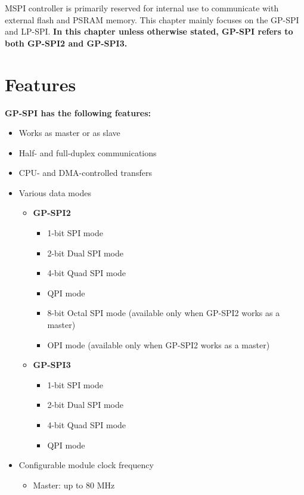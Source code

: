 \documentclass[main\_\_EN.tex]{subfiles}
\begin{document}
MSPI controller is primarily reserved for internal use to communicate with external flash and PSRAM memory. This chapter mainly focuses on the GP-SPI and LP-SPI. \textbf{ In this chapter unless otherwise stated, GP-SPI refers to both GP-SPI2 and GP-SPI3.}



\section{Features}

\textbf{GP-SPI has the following features:}
\begin{itemize}
    \item Works as master or as slave
    \item Half- and full-duplex communications
    \item CPU- and DMA-controlled transfers
    \item Various data modes
        \begin{itemize}
            \item \textbf{GP-SPI2}
            \begin{itemize}
                \item 1-bit SPI mode
                \item 2-bit Dual SPI mode
                \item 4-bit Quad SPI mode
                \item QPI mode
                \item 8-bit Octal SPI mode (available only when GP-SPI2 works as a master)
                \item OPI mode (available only when GP-SPI2 works as a master)
        \end{itemize}
            \item \textbf{GP-SPI3}
            \begin{itemize}
                \item 1-bit SPI mode
                \item 2-bit Dual SPI mode
                \item 4-bit Quad SPI mode
                \item QPI mode
        \end{itemize}
        \end{itemize}
    \item Configurable module clock frequency
        \begin{itemize}
            \item Master: up to 80 MHz

\end{itemize}
\end{itemize}
\end{document}
